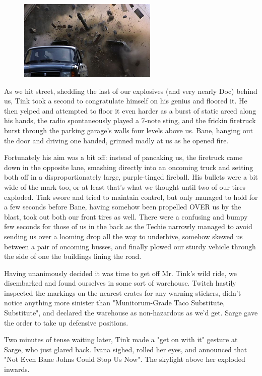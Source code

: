 \begin{figure}
	\begin{center}
		\includegraphics[width=\figwidth]{pics/19/49.png}
	\end{center}
\end{figure}
As we hit street, shedding the last of our explosives (and very nearly Doc) behind us, Tink took a second to congratulate himself on his genius and floored it. 
He then yelped and attempted to floor it even harder as a burst of static arced along his hands, the radio spontaneously played a 7-note sting, and the frickin firetruck burst through the parking garage's walls four levels above us. 
Bane, hanging out the door and driving one handed, grinned madly at us as he opened fire.

Fortunately his aim was a bit off: 
instead of pancaking us, the firetruck came down in the opposite lane, smashing directly into an oncoming truck and setting both off in a disproportionately large, purple-tinged fireball. 
His bullets were a bit wide of the mark too, or at least that's what we thought until two of our tires exploded. 
Tink swore and tried to maintain control, but only managed to hold for a few seconds before Bane, having somehow been propelled OVER us by the blast, took out both our front tires as well. 
There were a confusing and bumpy few seconds for those of us in the back as the Techie narrowly managed to avoid sending us over a looming drop all the way to underhive, somehow skewed us between a pair of oncoming busses, and finally plowed our sturdy vehicle through the side of one the buildings lining the road. 


Having unanimously decided it was time to get off Mr. 
Tink's wild ride, we disembarked and found ourselves in some sort of warehouse. 
Twitch hastily inspected the markings on the nearest crates for any warning stickers, didn't notice anything more sinister than "Munitorum-Grade Taco Substitute, Substitute", and declared the warehouse as non-hazardous as we'd get. 
Sarge gave the order to take up defensive positions.

Two minutes of tense waiting later, Tink made a "get on with it" gesture at Sarge, who just glared back. 
Ivana sighed, rolled her eyes, and announced that "Not Even Bane Johns Could Stop Us Now". 
The skylight above her exploded inwards.

